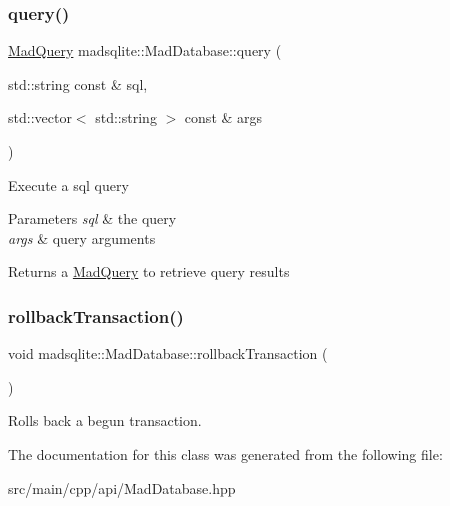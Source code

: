 \subsubsection{\texorpdfstring{query()}{query()}\hspace{0.1cm}{\footnotesize\ttfamily [2/2]}}
{\footnotesize\ttfamily \hyperlink{classmadsqlite_1_1_mad_query}{Mad\+Query} madsqlite\+::\+Mad\+Database\+::query (\begin{DoxyParamCaption}\item[{std\+::string const \&}]{sql,  }\item[{std\+::vector$<$ std\+::string $>$ const \&}]{args }\end{DoxyParamCaption})}

Execute a sql query


\begin{DoxyParams}{Parameters}
{\em sql} & the query \\
\hline
{\em args} & query arguments \\
\hline
\end{DoxyParams}
\begin{DoxyReturn}{Returns}
a \hyperlink{classmadsqlite_1_1_mad_query}{Mad\+Query} to retrieve query results 
\end{DoxyReturn}
\hypertarget{classmadsqlite_1_1_mad_database_a3ebfd4349bde98e99dace3875c964861}{}\label{classmadsqlite_1_1_mad_database_a3ebfd4349bde98e99dace3875c964861} 
\subsubsection{\texorpdfstring{rollback\+Transaction()}{rollbackTransaction()}}
{\footnotesize\ttfamily void madsqlite\+::\+Mad\+Database\+::rollback\+Transaction (\begin{DoxyParamCaption}{ }\end{DoxyParamCaption})}

Rolls back a begun transaction. 

The documentation for this class was generated from the following file\+:\begin{DoxyCompactItemize}
\item 
src/main/cpp/api/Mad\+Database.\+hpp\end{DoxyCompactItemize}

